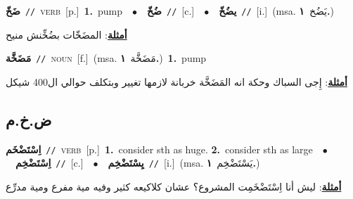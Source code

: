 \documentclass[10pt,a4paper,twoside]{article} %
\begin{document}
\begin{multicols}{2}
{\setlength\topsep{0pt}\textbf{\foreignlanguage{arabic}{ضَخّ}}\ {\color{gray}\texttt{//}\color{black}}\ \textsc{verb}\ [p.]\ \textbf{1.}~pump\ \ $\bullet$\ \ \setlength\topsep{0pt}\textbf{\foreignlanguage{arabic}{ضُخّ}}\ {\color{gray}\texttt{//}\color{black}}\ [c.]\ \ $\bullet$\ \ \setlength\topsep{0pt}\textbf{\foreignlanguage{arabic}{يضُخّ}}\ {\color{gray}\texttt{//}\color{black}}\ [i.]\ \color{gray}(msa. \foreignlanguage{arabic}{يَضُخ}~\foreignlanguage{arabic}{\textbf{١.}})\color{black}\  \begin{flushright}\color{gray}\foreignlanguage{arabic}{\textbf{\underline{\foreignlanguage{arabic}{أمثلة}}}: المضَخّات بضُخِّنش منيح}\end{flushright}\color{black}} \vspace{2mm}

{\setlength\topsep{0pt}\textbf{\foreignlanguage{arabic}{مَضَخَّة}}\ {\color{gray}\texttt{//}\color{black}}\ \textsc{noun}\ [f.]\ \color{gray}(msa. \foreignlanguage{arabic}{مَضَخَّة}~\foreignlanguage{arabic}{\textbf{١.}})\color{black}\ \textbf{1.}~pump\  \begin{flushright}\color{gray}\foreignlanguage{arabic}{\textbf{\underline{\foreignlanguage{arabic}{أمثلة}}}: إِجى السباك وحكة انه المَضَخَّة خربانة لازمها تغيير وبتكلف حوالي ال400 شيكل}\end{flushright}\color{black}} \vspace{2mm}

\vspace{-3mm}
\subsection*{\color{blue}\foreignlanguage{arabic}{ض.خ.م}\color{blue}{}} 

{\setlength\topsep{0pt}\textbf{\foreignlanguage{arabic}{اِسْتَضْخَم}}\ {\color{gray}\texttt{//}\color{black}}\ \textsc{verb}\ [p.]\ \textbf{1.}~consider sth as huge.  \textbf{2.}~consider sth as large\ \ $\bullet$\ \ \setlength\topsep{0pt}\textbf{\foreignlanguage{arabic}{اِسْتَضْخِم}}\ {\color{gray}\texttt{//}\color{black}}\ [c.]\ \ $\bullet$\ \ \setlength\topsep{0pt}\textbf{\foreignlanguage{arabic}{يِسْتَضْخِم}}\ {\color{gray}\texttt{//}\color{black}}\ [i.]\ \color{gray}(msa. \foreignlanguage{arabic}{يَسْتَضْخِم}~\foreignlanguage{arabic}{\textbf{١.}})\color{black}\  \begin{flushright}\color{gray}\foreignlanguage{arabic}{\textbf{\underline{\foreignlanguage{arabic}{أمثلة}}}: ليش أنا اِسْتَضْخَمِت المشروع؟ عشان كلاكيعه كثير وفيه مية مفرع ومية مدرِّع}\end{flushright}\color{black}} \vspace{2mm}


\end{multicols}
\end{document}
